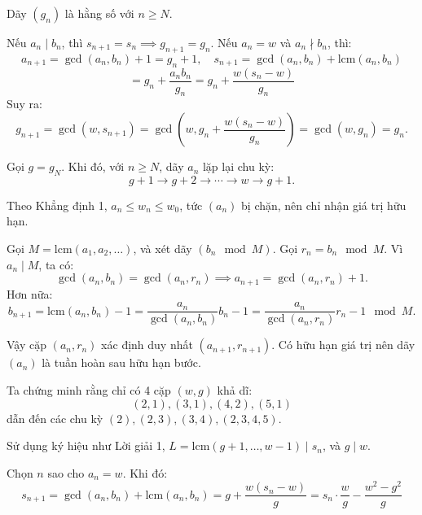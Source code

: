 \begin{problem}
\begin{soln}
    \begin{claim*}
        Dãy \( (g_n) \) là hằng số với \( n \ge N \).
    \end{claim*}

    \begin{subproof}
        Nếu \( a_n \mid b_n \), thì \( s_{n+1} = s_n \implies g_{n+1} = g_n \). Nếu \( a_n = w \) và \( a_n \nmid b_n \), thì:
        \[
            a_{n+1} = \gcd(a_n, b_n) + 1 = g_n + 1, \quad s_{n+1} = \gcd(a_n, b_n) + \text{lcm}(a_n, b_n)
        \]
        \[
            = g_n + \frac{a_n b_n}{g_n} = g_n + \frac{w(s_n - w)}{g_n}
        \]
        Suy ra:
        \[
            g_{n+1} = \gcd(w, s_{n+1}) = \gcd\left(w, g_n + \frac{w(s_n - w)}{g_n}\right) = \gcd(w, g_n) = g_n.
        \]
    \end{subproof}

    Gọi \( g = g_N \). Khi đó, với \( n \ge N \), dãy \( a_n \) lặp lại chu kỳ:
    \[
        g + 1 \to g + 2 \to \cdots \to w \to g + 1.
    \]
\end{soln}

\begin{soln}
    Theo Khẳng định 1, \( a_n \le w_n \le w_0 \), tức \( (a_n) \) bị chặn, nên chỉ nhận giá trị hữu hạn.

    Gọi \( M = \text{lcm}(a_1, a_2, \ldots) \), và xét dãy \( (b_n \mod M) \). Gọi \( r_n = b_n \mod M \). Vì \( a_n \mid M \), ta có:
    \[
        \gcd(a_n, b_n) = \gcd(a_n, r_n) \implies a_{n+1} = \gcd(a_n, r_n) + 1.
    \]
    Hơn nữa:
    \[
        b_{n+1} = \text{lcm}(a_n, b_n) - 1 = \frac{a_n}{\gcd(a_n, b_n)} b_n - 1 = \frac{a_n}{\gcd(a_n, r_n)} r_n - 1 \mod M.
    \]

    Vậy cặp \( (a_n, r_n) \) xác định duy nhất \( (a_{n+1}, r_{n+1}) \). Có hữu hạn giá trị nên dãy \( (a_n) \) là tuần hoàn sau hữu hạn bước.
\end{soln}

\begin{remark*}
    Ta chứng minh rằng chỉ có 4 cặp \( (w, g) \) khả dĩ:
    \[
        (2, 1), (3, 1), (4, 2), (5, 1)
    \]
    dẫn đến các chu kỳ \( (2), (2, 3), (3, 4), (2, 3, 4, 5) \).

    Sử dụng ký hiệu như Lời giải 1, \( L = \text{lcm}(g + 1, \ldots, w - 1) \mid s_n \), và \( g \mid w \).

    Chọn \( n \) sao cho \( a_n = w \). Khi đó:
    \[
        s_{n+1} = \gcd(a_n, b_n) + \text{lcm}(a_n, b_n) = g + \frac{w(s_n - w)}{g} = s_n \cdot \frac{w}{g} - \frac{w^2 - g^2}{g}
    \]
    

\end{remark*}
\end{problem}
